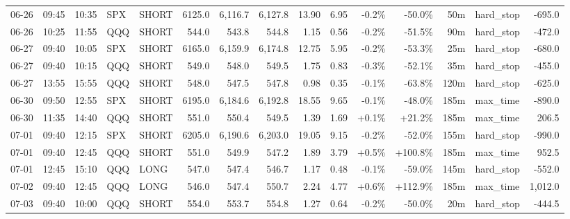 \documentclass[11pt,a4paper,twoside]{article}
\begin{document}
\begin{landscape}
\begin{center}
\begin{longtable}{>{\color{txtmain}}l l l l l r r r r r r r r >{\color{txtmain}}l r}
06-26 & 09:45 & 10:35 & SPX & SHORT & 6125.0 & 6,116.7 & 6,127.8 & 13.90 & 6.95 & \textcolor{lossred}{-0.2\%} & \textcolor{lossred}{-50.0\%} & 50m & hard\_stop & \textcolor{lossred}{-695.0} \\
06-26 & 10:25 & 11:55 & QQQ & SHORT & 544.0 & 543.8 & 544.8 & 1.15 & 0.56 & \textcolor{lossred}{-0.2\%} & \textcolor{lossred}{-51.5\%} & 90m & hard\_stop & \textcolor{lossred}{-472.0} \\
06-27 & 09:40 & 10:05 & SPX & SHORT & 6165.0 & 6,159.9 & 6,174.8 & 12.75 & 5.95 & \textcolor{lossred}{-0.2\%} & \textcolor{lossred}{-53.3\%} & 25m & hard\_stop & \textcolor{lossred}{-680.0} \\
06-27 & 09:40 & 10:15 & QQQ & SHORT & 549.0 & 548.0 & 549.5 & 1.75 & 0.83 & \textcolor{lossred}{-0.3\%} & \textcolor{lossred}{-52.1\%} & 35m & hard\_stop & \textcolor{lossred}{-455.0} \\
06-27 & 13:55 & 15:55 & QQQ & SHORT & 548.0 & 547.5 & 547.8 & 0.98 & 0.35 & \textcolor{lossred}{-0.1\%} & \textcolor{lossred}{-63.8\%} & 120m & hard\_stop & \textcolor{lossred}{-625.0} \\
06-30 & 09:50 & 12:55 & SPX & SHORT & 6195.0 & 6,184.6 & 6,192.8 & 18.55 & 9.65 & \textcolor{lossred}{-0.1\%} & \textcolor{lossred}{-48.0\%} & 185m & max\_time & \textcolor{lossred}{-890.0} \\
06-30 & 11:35 & 14:40 & QQQ & SHORT & 551.0 & 550.4 & 549.5 & 1.39 & 1.69 & \textcolor{wingreen}{+0.1\%} & \textcolor{wingreen}{+21.2\%} & 185m & max\_time & \textcolor{wingreen}{206.5} \\
07-01 & 09:40 & 12:15 & SPX & SHORT & 6205.0 & 6,190.6 & 6,203.0 & 19.05 & 9.15 & \textcolor{lossred}{-0.2\%} & \textcolor{lossred}{-52.0\%} & 155m & hard\_stop & \textcolor{lossred}{-990.0} \\
07-01 & 09:40 & 12:45 & QQQ & SHORT & 551.0 & 549.9 & 547.2 & 1.89 & 3.79 & \textcolor{wingreen}{+0.5\%} & \textcolor{wingreen}{+100.8\%} & 185m & max\_time & \textcolor{wingreen}{952.5} \\
07-01 & 12:45 & 15:10 & QQQ & LONG & 547.0 & 547.4 & 546.7 & 1.17 & 0.48 & \textcolor{lossred}{-0.1\%} & \textcolor{lossred}{-59.0\%} & 145m & hard\_stop & \textcolor{lossred}{-552.0} \\
07-02 & 09:40 & 12:45 & QQQ & LONG & 546.0 & 547.4 & 550.7 & 2.24 & 4.77 & \textcolor{wingreen}{+0.6\%} & \textcolor{wingreen}{+112.9\%} & 185m & max\_time & \textcolor{wingreen}{1,012.0} \\
07-03 & 09:40 & 10:00 & QQQ & SHORT & 554.0 & 553.7 & 554.8 & 1.27 & 0.64 & \textcolor{lossred}{-0.2\%} & \textcolor{lossred}{-50.0\%} & 20m & hard\_stop & \textcolor{lossred}{-444.5} \\

\end{longtable}
\end{center}
\end{landscape}
\end{document}
